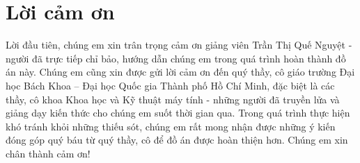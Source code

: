 \section*{Lời cảm ơn}
Lời đầu tiên, chúng em xin trân trọng cảm ơn giảng viên Trần Thị Quế Nguyệt - người đã trực tiếp chỉ bảo, hướng dẫn chúng em trong quá trình hoàn thành đồ án này. Chúng em cũng xin được gửi lời cảm ơn đến quý thầy, cô giáo trường Đại học Bách Khoa – Đại học Quốc gia Thành phố Hồ Chí Minh, đặc biệt là các thầy, cô khoa Khoa học và Kỹ thuật máy tính - những người đã truyền lửa và giảng dạy kiến thức cho chúng em suốt thời gian qua. Trong quá trình thực hiện khó tránh khỏi những thiếu sót, chúng em rất mong nhận được những ý kiến đóng góp quý báu từ quý thầy, cô để đồ án được hoàn thiện hơn. Chúng em xin chân thành cảm ơn!
